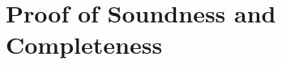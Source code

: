 \documentclass[letterpaper]{article}
\theoremstyle{definition}
\newcommand{\proves}{\vdash}
\begin{document}
\reductioncorollary*

\section{Proof of Soundness and Completeness}

\reductionaxioms*

\modelbuilding*

\completeness



\end{document}

